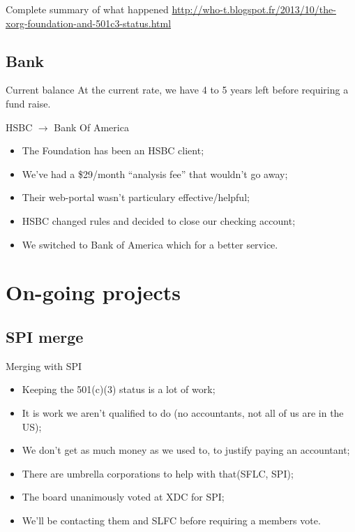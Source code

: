 \documentclass{beamer}
\begin{document}
		\begin{frame}
			\begin{block}{Complete summary of what happened}
				\url{http://who-t.blogspot.fr/2013/10/the-xorg-foundation-and-501c3-status.html}
			\end{block}
		\end{frame}

		\subsection{Bank}
		\begin{frame}
			\begin{block}{Current balance}
				At the current rate, we have 4 to 5 years left before requiring a fund raise.
			\end{block}

			\begin{block}{HSBC $\rightarrow$ Bank Of America}
				\begin{itemize}
					\item The Foundation has been an HSBC client;
					\item We've had a \$29/month ``analysis fee'' that wouldn't go away;
					\item Their web-portal wasn't particulary effective/helpful;
					\item HSBC changed rules and decided to close our checking account;
					\item We switched to Bank of America which for a better service.
				\end{itemize}
			\end{block}
		\end{frame}

	\section{On-going projects}
		\subsection{SPI merge}
		\begin{frame}
			\begin{block}{Merging with SPI}
				\begin{itemize}
					\item Keeping the 501(c)(3) status is a lot of work;
					\item It is work we aren't qualified to do (no accountants, not all of us are in the US);
					\item We don't get as much money as we used to, to justify paying an accountant;
					\item There are umbrella corporations to help with that(SFLC, SPI);
					\item The board unanimously voted at XDC for SPI;
					\item We'll be contacting them and SLFC before requiring a members vote.
				\end{itemize}
			\end{block}
		\end{frame}
\end{document}
